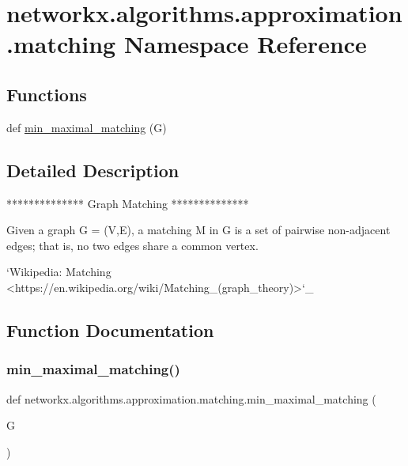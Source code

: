 \hypertarget{namespacenetworkx_1_1algorithms_1_1approximation_1_1matching}{}\section{networkx.\+algorithms.\+approximation.\+matching Namespace Reference}
\label{namespacenetworkx_1_1algorithms_1_1approximation_1_1matching}
\subsection*{Functions}
\begin{DoxyCompactItemize}
\item 
def \hyperlink{namespacenetworkx_1_1algorithms_1_1approximation_1_1matching_a8bda0ec269485cf38d7dff1e87c2889a}{min\+\_\+maximal\+\_\+matching} (G)
\end{DoxyCompactItemize}


\subsection{Detailed Description}
\begin{DoxyVerb}**************
Graph Matching
**************

Given a graph G = (V,E), a matching M in G is a set of pairwise non-adjacent
edges; that is, no two edges share a common vertex.

`Wikipedia: Matching <https://en.wikipedia.org/wiki/Matching_(graph_theory)>`_
\end{DoxyVerb}
 

\subsection{Function Documentation}
\mbox{\label{namespacenetworkx_1_1algorithms_1_1approximation_1_1matching_a8bda0ec269485cf38d7dff1e87c2889a}} 
\subsubsection{\texorpdfstring{min\+\_\+maximal\+\_\+matching()}{min\_maximal\_matching()}}
{\footnotesize\ttfamily def networkx.\+algorithms.\+approximation.\+matching.\+min\+\_\+maximal\+\_\+matching (\begin{DoxyParamCaption}\item[{}]{G }\end{DoxyParamCaption})}


